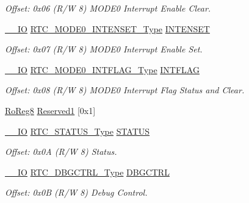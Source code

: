 \begin{DoxyCompactItemize}
\begin{DoxyCompactList}\small\item\em Offset\+: 0x06 (R/W 8) M\+O\+D\+E0 Interrupt Enable Clear. \end{DoxyCompactList}\item 
\mbox{\hyperlink{core__cm0plus_8h_aec43007d9998a0a0e01faede4133d6be}{\+\_\+\+\_\+\+IO}} \mbox{\hyperlink{union_r_t_c___m_o_d_e0___i_n_t_e_n_s_e_t___type}{R\+T\+C\+\_\+\+M\+O\+D\+E0\+\_\+\+I\+N\+T\+E\+N\+S\+E\+T\+\_\+\+Type}} \mbox{\hyperlink{struct_rtc_mode0_a13d129afc309b1c04013da81cd68c7a2}{I\+N\+T\+E\+N\+S\+ET}}
\begin{DoxyCompactList}\small\item\em Offset\+: 0x07 (R/W 8) M\+O\+D\+E0 Interrupt Enable Set. \end{DoxyCompactList}\item 
\mbox{\hyperlink{core__cm0plus_8h_aec43007d9998a0a0e01faede4133d6be}{\+\_\+\+\_\+\+IO}} \mbox{\hyperlink{union_r_t_c___m_o_d_e0___i_n_t_f_l_a_g___type}{R\+T\+C\+\_\+\+M\+O\+D\+E0\+\_\+\+I\+N\+T\+F\+L\+A\+G\+\_\+\+Type}} \mbox{\hyperlink{struct_rtc_mode0_a6a1318e5b745f1a76f1ee998789414cb}{I\+N\+T\+F\+L\+AG}}
\begin{DoxyCompactList}\small\item\em Offset\+: 0x08 (R/W 8) M\+O\+D\+E0 Interrupt Flag Status and Clear. \end{DoxyCompactList}\item 
\mbox{\hyperlink{group___s_a_m_d21_e15_a__definitions_ga0d957f1433aaf5d70e4dc2b68288442d}{Ro\+Reg8}} \mbox{\hyperlink{struct_rtc_mode0_a092866123ac46d0985136e4dca2f36f4}{Reserved1}} \mbox{[}0x1\mbox{]}
\item 
\mbox{\hyperlink{core__cm0plus_8h_aec43007d9998a0a0e01faede4133d6be}{\+\_\+\+\_\+\+IO}} \mbox{\hyperlink{union_r_t_c___s_t_a_t_u_s___type}{R\+T\+C\+\_\+\+S\+T\+A\+T\+U\+S\+\_\+\+Type}} \mbox{\hyperlink{struct_rtc_mode0_a18fb82dd8352b8ac5b64e276ab0b5268}{S\+T\+A\+T\+US}}
\begin{DoxyCompactList}\small\item\em Offset\+: 0x0A (R/W 8) Status. \end{DoxyCompactList}\item 
\mbox{\hyperlink{core__cm0plus_8h_aec43007d9998a0a0e01faede4133d6be}{\+\_\+\+\_\+\+IO}} \mbox{\hyperlink{union_r_t_c___d_b_g_c_t_r_l___type}{R\+T\+C\+\_\+\+D\+B\+G\+C\+T\+R\+L\+\_\+\+Type}} \mbox{\hyperlink{struct_rtc_mode0_a291f72f633a731e348a16601bc63a11a}{D\+B\+G\+C\+T\+RL}}
\begin{DoxyCompactList}\small\item\em Offset\+: 0x0B (R/W 8) Debug Control. \end{DoxyCompactList}\item 

\end{DoxyCompactItemize}
